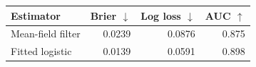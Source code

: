 \begin{tabular}{lrrr}\toprule
Estimator & Brier $\downarrow$ & Log loss $\downarrow$ & AUC $\uparrow$ \\ \midrule
Mean-field filter & 0.0239 & 0.0876 & 0.875 \\
Fitted logistic & 0.0139 & 0.0591 & 0.898 \\
\bottomrule\end{tabular}
